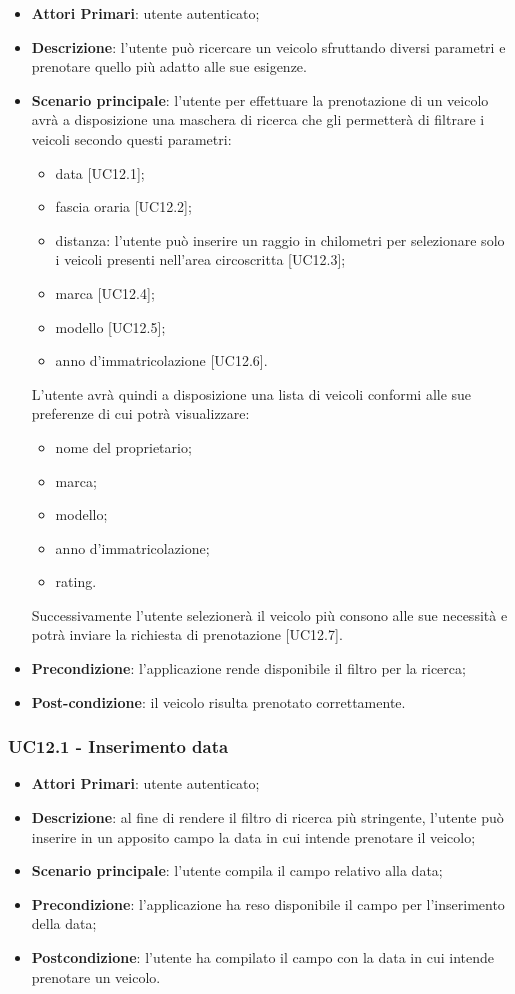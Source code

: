\begin{itemize}
	\item \textbf{Attori Primari}: utente autenticato;
	\item \textbf{Descrizione}: l'utente può ricercare un veicolo sfruttando diversi parametri e prenotare quello più adatto alle sue esigenze.
	\item \textbf{Scenario principale}: l'utente per effettuare la prenotazione di un veicolo avrà a disposizione una maschera di ricerca che gli permetterà di filtrare i veicoli secondo questi parametri:
	\begin{itemize}
		\item data [UC12.1];
		\item fascia oraria [UC12.2];
		\item distanza: l'utente può inserire un raggio in chilometri per selezionare solo i veicoli presenti nell'area circoscritta [UC12.3]; 
		\item marca [UC12.4];
		\item modello [UC12.5];
		\item anno d'immatricolazione [UC12.6].
	\end{itemize}
	L'utente avrà quindi a disposizione una lista di veicoli conformi alle sue preferenze di cui potrà visualizzare:
	\begin{itemize}		
		\item nome del proprietario;
		\item marca;
		\item modello;
		\item anno d'immatricolazione;
		\item rating.
	\end{itemize}
	Successivamente l'utente selezionerà il veicolo più consono alle sue necessità e potrà inviare la richiesta di prenotazione [UC12.7].
	\item \textbf{Precondizione}: l'applicazione rende disponibile il filtro per la ricerca;
	\item \textbf{Post-condizione}: il veicolo risulta prenotato correttamente.
\end{itemize} 
\subsubsection{UC12.1 - Inserimento data}
\begin{itemize}
	\item \textbf{Attori Primari}: utente autenticato;
	\item \textbf{Descrizione}: al fine di rendere il filtro di ricerca più stringente, l'utente può inserire in un apposito campo la data in cui intende prenotare il veicolo;
	\item \textbf{Scenario principale}: l'utente compila il campo relativo alla data;	
	\item \textbf{Precondizione}: l'applicazione ha reso disponibile il campo per l'inserimento della data;
	\item \textbf{Postcondizione}: l'utente ha compilato il campo con la data in cui intende prenotare un veicolo.	
\end{itemize}

